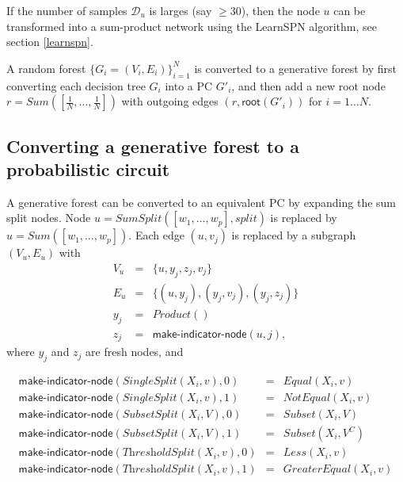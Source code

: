 \documentclass{article}
\newcommand{\func}[1]{\ensuremath{\textsf{#1}}} %
\newcommand{\obj}[1]{\ensuremath{\textit{#1}}} %
\newcommand{\set}[1]{\ensuremath{\{ #1 \} }} %
\begin{document}
\vspace{0.5cm}
\noindent
If the number of samples $\mathcal{D}_u$ is larges (say $\geq 30$), then the node $u$ can be transformed into a sum-product network using the LearnSPN algorithm, see section \ref{learnspn}.

A random forest $\{ G_i = (V_i, E_i) \}_{i=1}^N$ is converted to a generative forest by first converting each decision tree $G_i$ into a PC $G'_i$, and then add a new root node $r = \obj{Sum}([\frac{1}{N}, \ldots, \frac{1}{N}])$ with outgoing edges $(r, \func{root}(G'_i))$ for $i = 1 \ldots N$. 

\subsection{Converting a generative forest to a probabilistic circuit}
A generative forest can be converted to an equivalent PC by expanding the sum split nodes. Node $u = \obj{SumSplit}([w_1, \ldots, w_p], \obj{split})$ is replaced by $u = \obj{Sum}([w_1, \ldots, w_p])$. Each edge $(u, v_j)$ is replaced by a subgraph $(V_u, E_u)$ with
\[
\begin{array}{lll}
     V_u & = & \set{u, y_j, z_j, v_j}  \\
     E_u & = & \set{(u, y_j), (y_j, v_j), (y_j, z_j)} \\
     y_j & = & \obj{Product}() \\
     z_j & = & \func{make-indicator-node}(u, j),
\end{array}
\]
where $y_j$ and $z_j$ are fresh nodes, and

\[
\begin{array}{lll}
     \func{make-indicator-node}(\obj{SingleSplit}(X_i, v), 0) & = & \obj{Equal}(X_i, v) \\
     \func{make-indicator-node}(\obj{SingleSplit}(X_i, v), 1) & = & \obj{NotEqual}(X_i, v) \\
     \func{make-indicator-node}(\obj{SubsetSplit}(X_i, V), 0) & = & \obj{Subset}(X_i, V) \\
     \func{make-indicator-node}(\obj{SubsetSplit}(X_i, V), 1) & = & \obj{Subset}(X_i, V^C) \\
     \func{make-indicator-node}(\obj{ThresholdSplit}(X_i, v), 0) & = & \obj{Less}(X_i, v) \\
     \func{make-indicator-node}(\obj{ThresholdSplit}(X_i, v), 1) & = & \obj{GreaterEqual}(X_i, v) \\
\end{array}
\]

\clearpage
\appendix
\end{document}
